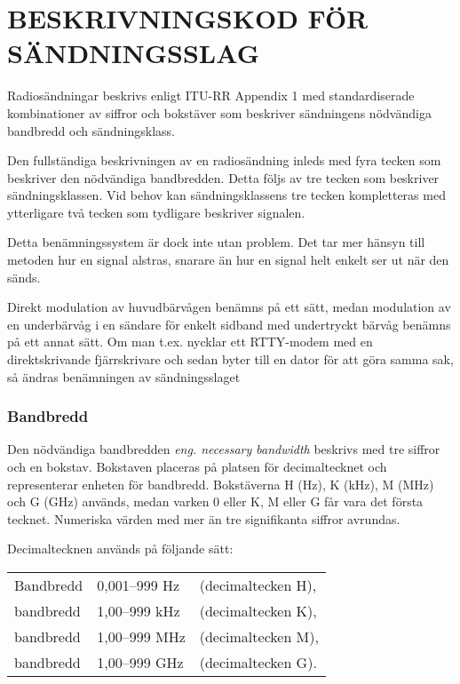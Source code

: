 \chapter{BESKRIVNINGSKOD FÖR SÄNDNINGSSLAG}


Radiosändningar beskrivs enligt ITU-RR Appendix 1 med standardiserade
kombinationer av siffror och bokstäver som beskriver sändningens nödvändiga
bandbredd och sändningsklass. 

Den fullständiga beskrivningen av en radiosändning inleds med fyra tecken
som beskriver den nödvändiga bandbredden. Detta följs av tre tecken som
beskriver sändningsklassen. Vid behov kan sändningsklassens tre tecken
kompletteras med ytterligare två tecken som tydligare beskriver signalen.

Detta benämningssystem är dock inte utan problem. Det tar mer hänsyn till
metoden hur en signal alstras, snarare än hur en signal helt enkelt ser ut när
den sänds.

Direkt modulation av huvudbärvågen benämns på ett sätt, medan modulation
av en underbärvåg i en sändare för enkelt sidband med undertryckt bärvåg
benämns på ett annat sätt. Om man t.ex. nycklar ett RTTY-modem med en
direktskrivande fjärrskrivare och sedan byter till en dator för att göra samma
sak, så ändras benämningen av sändningsslaget

\subsection{Bandbredd}

Den nödvändiga bandbredden \emph{eng. necessary bandwidth} beskrivs med
tre siffror och en bokstav. Bokstaven placeras på platsen för decimaltecknet
och representerar enheten för bandbredd. Bokstäverna H (Hz), K (kHz), M (MHz)
och G (GHz) används, medan varken 0 eller K, M eller G får vara det första
tecknet. Numeriska värden med mer än tre signifikanta siffror avrundas.

Decimaltecknen används på följande sätt:\\
\begin{tabular}{lll}
	Bandbredd & 0,001--999 Hz & (decimaltecken H),\\
	bandbredd & 1,00--999 kHz & (decimaltecken K),\\
	bandbredd & 1,00--999 MHz & (decimaltecken M),\\
	bandbredd & 1,00--999 GHz & (decimaltecken G).\\
\end{tabular}

